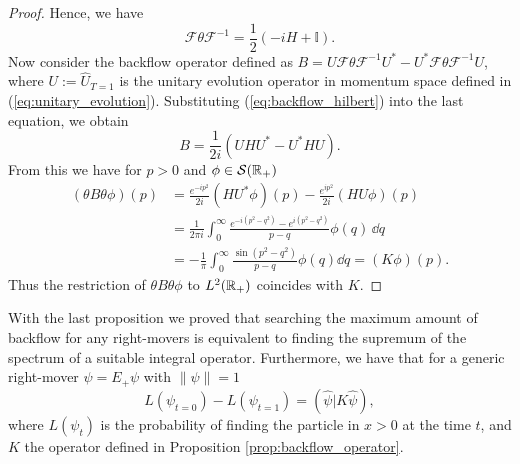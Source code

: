 \begin{proof}
	Hence, we have 
	\begin{equation}
	\label{eq:backflow_hilbert}
		\mathcal{F} \theta \mathcal{F}^{-1}=\frac{1}{2}(-iH+\mathbb{I}).
	\end{equation}
	Now consider the backflow operator defined as $B=U\mathcal{F} \theta \mathcal{F}^{-1}U^*-U^*\mathcal{F} \theta \mathcal{F}^{-1}U$, where $U:=\widehat{U}_{T=1}$ is the unitary evolution operator in momentum space defined in (\ref{eq:unitary_evolution}). Substituting (\ref{eq:backflow_hilbert}) into the last equation, we obtain
	\begin{equation}
		B=\frac{1}{2i}(UHU^*-U^*HU).
	\end{equation}
	From this we have for $p>0$ and $\phi\in \mathcal{S}({\mathbb R}_+)$
	\begin{equation}
	\begin{aligned}
	(\theta B\theta \phi)(p)&=\frac{e^{-ip^2}}{2i}(HU^*\phi)(p)-\frac{e^{ip^2}}{2i}(HU\phi)(p)\\
	&= \frac{1}{2\pi i}\int_{0}^{\infty}\frac{e^{-i(p^2-q^2)}-e^{i(p^2-q^2)}}{p-q}\phi(q)\, \dd q\\
	&= -\frac{1}{\pi}\int_{0}^{\infty}\frac{\sin(p^2-q^2)}{p-q}\phi(q)\dd q=(K\phi)(p).
	\end{aligned}	
	\end{equation}
	Thus the restriction of $\theta B\theta \phi$ to $L^2({\mathbb R}_+)$ coincides with $K$.
\end{proof}
\begin{oss}
	With the last proposition we proved that searching the maximum amount of backflow for any right-movers is equivalent to finding the supremum of the spectrum of a suitable integral operator. Furthermore, we have that for a generic right-mover $\psi=E_+\psi$ with $\|\psi\|=1$
	\begin{equation}
	L(\psi_{t=0})-L(\psi_{t=1})=(\hat{\psi}|K\hat{\psi}),
	\end{equation}
	where $L(\psi_t)$ is the probability of finding the particle in $x>0$ at the time $t$, and $K$ the operator defined in Proposition \ref{prop:backflow_operator}.
\end{oss}

